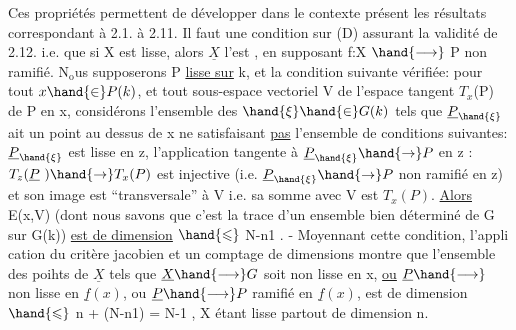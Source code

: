 Ces propriétés permettent de développer dans le contexte présent
les résultats correspondant à 2.1. à 2.11. Il faut une condition sur (D)
assurant la validité de 2.12. i.e. que si X est lisse, alors $\underline{X}$ l'est
, en supposant f:X $\hand{\longrightarrow}$ P non ramifié. N$_{\mathrm{o}}$us supposerons
 P \uline{lisse sur} k, et la condition suivante vérifiée: pour
tout $x \hand{\in} P(k)$, et tout sous-espace vectoriel V  de l'espace tangent
$T_x$(P) de P en x, considérons l'ensemble  des $\hand{\xi} \hand{\in} G(k)$ tels que
$\underline{P}_{\hand{\xi}}$ ait un point au dessus de x 
ne satisfaisant \uline{pas} l'ensemble de conditions suivantes: $\underline{P}_{\hand{\xi}}$ est lisse en
z, 
l'application tangente à $\underline{P}_{\hand{\xi}} \hand{\rightarrow} P$ en z : $T_z(\underline{P}\ ) \hand{\rightarrow} T_x(P)$ est injective
(i.e. $\underline{P}_{\hand{\xi}} \hand{\rightarrow} P$ non ramifié en z) et son image est ``transversale'' à V
i.e. sa somme avec V est $T_x(P)$. \uline{Alors} E(x,V) (dont nous savons que
c'est la trace d'un ensemble   bien déterminé de G sur G(k))
\uline{est de dimension} $\hand{\leqslant}$ N-n\unsure{\over{+}{-}|+}1 . - Moyennant cette condition,  l'appli\unsure{:|-}
cation du critère jacobien et un comptage de dimensions montre que
l'ensemble des poihts de $\underline{X}$ tels que $\underline{X} \hand{\longrightarrow} G$ soit non lisse en x, \uline{ou}
$\underline{P} \hand{\longrightarrow}$  non lisse en $\underline{f}(x)$, ou $\underline{P} \hand{\longrightarrow} P$ ramifié en $\underline{f}(x)$, est de
dimension $\hand{\leqslant}$ n + (N-n\unsure{\over{+}{-}|+}1) = N-1 , \hand{(}X étant lisse partout de dimension n\hand{)}.

